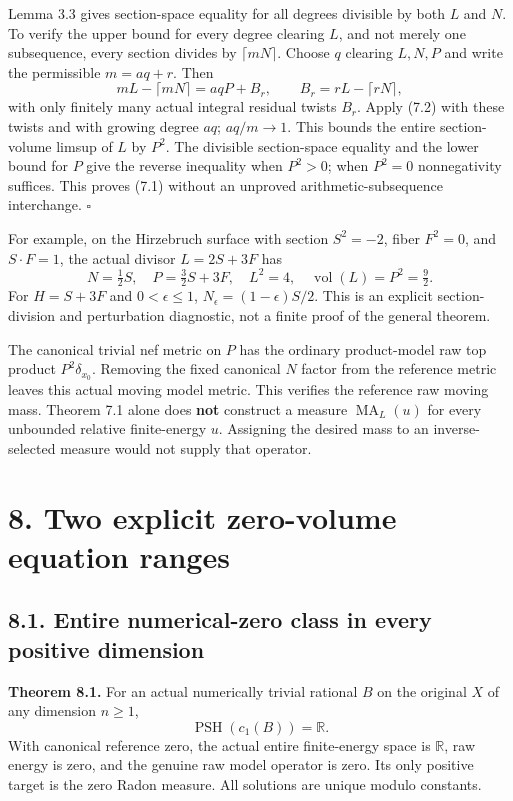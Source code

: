 \documentclass[
  10pt,
]{article}
\begin{document}
Lemma 3.3 gives section-space equality for all degrees divisible by both
\(L\) and \(N\). To verify the upper bound for every degree clearing
\(L\), and not merely one subsequence, every section divides by
\(\lceil mN\rceil\). Choose \(q\) clearing \(L,N,P\) and write the
permissible \(m=aq+r\). Then \[
 mL-\lceil mN\rceil=aqP+B_r,
 \qquad B_r=rL-\lceil rN\rceil,
\] with only finitely many actual integral residual twists \(B_r\).
Apply (7.2) with these twists and with growing degree \(aq\);
\(aq/m\to1\). This bounds the entire section-volume limsup of \(L\) by
\(P^2\). The divisible section-space equality and the lower bound for
\(P\) give the reverse inequality when \(P^2>0\); when \(P^2=0\)
nonnegativity suffices. This proves (7.1) without an unproved
arithmetic-subsequence interchange. \(\square\)

For example, on the Hirzebruch surface with section \(S^2=-2\), fiber
\(F^2=0\), and \(S\cdot F=1\), the actual divisor \(L=2S+3F\) has \[
 N=\tfrac12S,\quad P=\tfrac32S+3F,\quad L^2=4,
                     \quad\operatorname{vol}(L)=P^2=\tfrac92.
\] For \(H=S+3F\) and \(0<\epsilon\leq1\),
\(N_\epsilon=(1-\epsilon)S/2\). This is an explicit section-division and
perturbation diagnostic, not a finite proof of the general theorem.

The canonical trivial nef metric on \(P\) has the ordinary product-model
raw top product \(P^2\delta_{x_0}\). Removing the fixed canonical \(N\)
factor from the reference metric leaves this actual moving model metric.
This verifies the reference raw moving mass. Theorem 7.1 alone does
\textbf{not} construct a measure \(\operatorname{MA}_L(u)\) for every
unbounded relative finite-energy \(u\). Assigning the desired mass to an
inverse-selected measure would not supply that operator.

\section{8. Two explicit zero-volume equation
ranges}\label{two-explicit-zero-volume-equation-ranges}

\subsection{8.1. Entire numerical-zero class in every positive
dimension}\label{entire-numerical-zero-class-in-every-positive-dimension}

\textbf{Theorem 8.1.} For an actual numerically trivial rational \(B\)
on the original \(X\) of any dimension \(n\geq1\), \[
 \operatorname{PSH}(c_1(B))=\mathbb R.
                                                               \tag{8.1}
\] With canonical reference zero, the actual entire finite-energy space
is \(\mathbb R\), raw energy is zero, and the genuine raw model operator
is zero. Its only positive target is the zero Radon measure. All
solutions are unique modulo constants.
\end{document}
